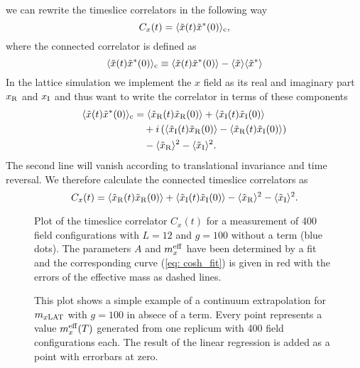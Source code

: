 %
%
we can rewrite the timeslice correlators in the following way
%
%
\begin{equation}
C_{x}(t) = \langle \tilde{x}(t) \tilde{x}^{*}(0) \rangle_{\rm c},
\end{equation}
%
%
where the connected correlator is defined as
%
%
\begin{equation}
\langle \tilde{x}(t) \tilde{x}^{*}(0) \rangle_{\rm c} \equiv \langle \tilde{x}(t) \tilde{x}^{*}(0) \rangle - \langle \tilde{x}\rangle \langle \tilde{x}^{*}\rangle
\end{equation}
%
%
In the lattice simulation we implement the $x$ field as its real and imaginary part $x_{\rm R}$ and $x_{\rm I}$ and thus want to write the correlator in terms of these components
%
%
\begin{equation}
\begin{alignedat}{2}
\langle \tilde{x}(t) \tilde{x}^{*}(0) \rangle_{\rm c} &= \langle\tilde{x}_{\rm R}(t)\tilde{x}_{\rm R}(0)\rangle + \langle \tilde{x}_{\rm I}(t)\tilde{x}_{\rm I}(0)\rangle \\
&\quad +i \left( \langle\tilde{x}_{\rm I}(t)\tilde{x}_{\rm R}(0)\rangle - \langle\tilde{x}_{\rm R}(t)\tilde{x}_{\rm I}(0)\rangle \right) \\
&\quad - \langle \tilde{x}_{\rm R}\rangle^{2} - \langle \tilde{x}_{\rm I}\rangle^{2}.
\end{alignedat}
\end{equation}
%
%
The second line will vanish according to translational invariance and time reversal. We therefore calculate the connected timeslice correlators as
%
%
\begin{equation}
C_{x}(t) = \langle\tilde{x}_{\rm R}(t)\tilde{x}_{\rm R}(0)\rangle + \langle \tilde{x}_{\rm I}(t)\tilde{x}_{\rm I}(0)\rangle - \langle \tilde{x}_{\rm R}\rangle^{2} - \langle \tilde{x}_{\rm I}\rangle^{2}.
\end{equation}
%
%
%
\begin{figure}
\centering

\caption{Plot of the timeslice correlator $C_{x}(t)$ for a measurement of 400 field configurations with $L=12$ and $g=100$ without a  term (blue dots). The parameters $A$ and $m_{x}^{\rm eff}$ have been determined by a fit and the corresponding curve (\ref{eq: cosh_fit}) is given in red with the errors of the effective mass as dashed lines.\label{fig: coshcorr}}
\end{figure}
%
%
\begin{figure}
\centering

\caption{This plot shows a simple example of a continuum extrapolation for $m_{x\rm LAT}$ with $g=100$ in absece of a  term. Every point represents a value $m_{x}^{\rm eff}(T)$ generated from one replicum with 400 field configurations each. The result of the linear regression is added as a point with errorbars at zero. \label{fig: massfit_cosh}}
\end{figure}
%
%
%
%
%
%
%
%
%

